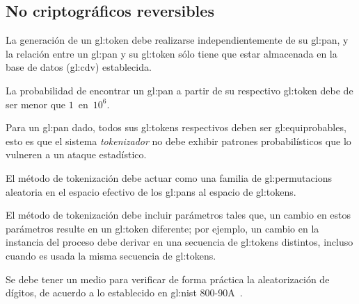 %
%

\subsection{No criptográficos reversibles}

{
  La generación de un \gls{gl:token} debe realizarse independientemente de
  su \gls{gl:pan}, y la relación entre un \gls{gl:pan} y su \gls{gl:token}
  sólo tiene que estar almacenada en la base de datos (\gls{gl:cdv})
  establecida.
}

{
  La probabilidad de encontrar un \gls{gl:pan} a partir de su respectivo
  \gls{gl:token} debe de ser menor que $1$~en~$10^6$.
}

{
  Para un \gls{gl:pan} dado, todos sus \glspl{gl:token} respectivos
  deben ser \glspl{gl:equiprobable}, esto es que el sistema
  \textit{tokenizador} no debe exhibir patrones probabilísticos que
  lo vulneren a un ataque estadístico.
}

{
  El método de tokenización debe actuar como una familia de
  \glspl{gl:permutacion} aleatoria en el espacio efectivo de los
  \glspl{gl:pan} al espacio de \glspl{gl:token}.
}

{
  El método de tokenización debe incluir parámetros tales que, un
  cambio en estos parámetros resulte en un \gls{gl:token} diferente;
  por ejemplo, un cambio en la instancia del proceso debe derivar en
  una secuencia de \glspl{gl:token} distintos, incluso cuando es usada
  la misma secuencia de \glspl{gl:token}.
}


{
  Se debe tener un medio para verificar de forma práctica la aleatorización
  de dígitos, de acuerdo a lo establecido en \gls{gl:nist}
  800-90A~\cite{nist_aleatorios}.
}

